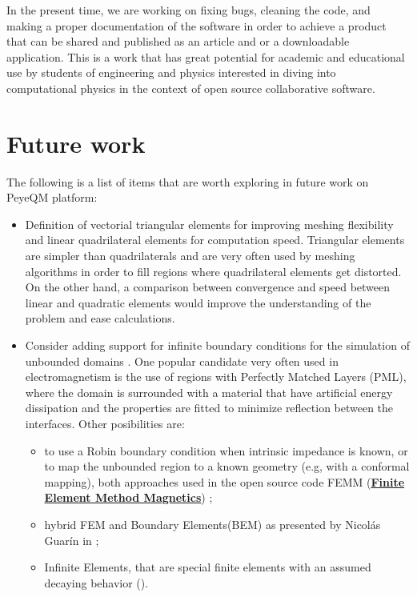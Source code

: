 In the present time, we are working on fixing bugs, cleaning the code, and making a proper documentation of the software in order to achieve a product that can be shared and published as an article and or a downloadable application. This is a work that has great potential for academic and educational use by students of engineering and physics interested in diving into computational physics in the context of open source collaborative software.  
 

\section{Future work}
The following is a list of items that are worth exploring in future work on PeyeQM platform:
\begin{itemize}
%
\item Definition of vectorial triangular elements for improving meshing flexibility and linear quadrilateral elements for computation speed. Triangular elements are simpler than quadrilaterals and are very often used by meshing algorithms in order to fill regions where quadrilateral elements get distorted. On the other hand, a comparison between convergence and speed between linear and quadratic elements would improve the understanding of the problem and ease calculations.
%
\item Consider adding support for infinite boundary conditions for the simulation of unbounded domains \cite{antoine2009review, appelo2003}. One popular candidate very often used in electromagnetism is the use of regions with Perfectly Matched Layers (PML)\cite{Jin2010}, where the domain is surrounded with a material that have artificial energy dissipation and the properties are fitted to minimize reflection between the interfaces. Other posibilities are:
\begin{itemize}
\item to use a Robin boundary condition when intrinsic impedance is known, or to map the unbounded region to a known geometry (e.g, with a conformal mapping), both approaches used in the open source code FEMM (\href{http://www.femm.info/wiki/HomePage}{\textbf{Finite Element Method Magnetics}}) \cite{meeker2010_FEMM};
\item hybrid FEM and Boundary Elements(BEM) as presented by Nicol\'as Guar\'in in \cite{Guarin2012};
\item Infinite Elements, that are special finite elements with an assumed decaying behavior (\cite{Zienkiewicz2005}).
\end{itemize} 

\end{itemize}
